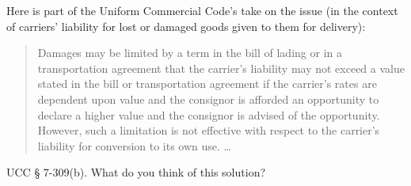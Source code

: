 Here is part of the Uniform Commercial Code's take on the issue (in the context
of carriers' liability for lost or damaged goods given to them for delivery):
\begin{quote}
Damages may be limited by a term in the bill of lading or in a transportation
agreement that the carrier's liability may not exceed a value stated in the
bill or transportation agreement if the carrier's rates are dependent upon
value and the consignor is afforded an opportunity to declare a higher value
and the consignor is advised of the opportunity. However, such a limitation is
not effective with respect to the carrier's liability for conversion to its own
use. \ldots
\end{quote}
UCC {\S} 7-309(b). What do you think of this solution?

